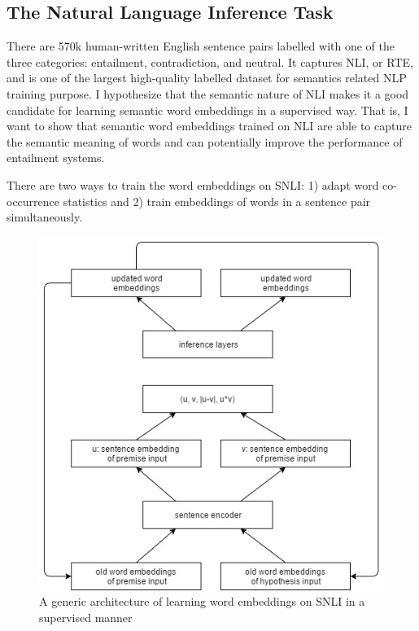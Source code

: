 \documentclass[10pt,twocolumn,letterpaper]{article}
\begin{document}
\subsection{The Natural Language Inference Task}
There are 570k human-written English sentence pairs labelled with one of the three categories: entailment, contradiction, and neutral. It captures NLI, or RTE, and is one of the largest high-quality labelled dataset for semantics related NLP training purpose. I hypothesize that the semantic nature of NLI makes it a good candidate for learning semantic word embeddings in a supervised way. That is, I want to show that semantic word embeddings trained on NLI are able to capture the semantic meaning of words and can potentially improve the performance of entailment systems.

There are two ways to train the word embeddings on SNLI: 1) adapt word co-occurrence statistics and 2) train embeddings of words in a sentence pair simultaneously.

\begin{figure}[ht]
\begin{center}
\includegraphics[scale=0.5]{model_architecture}
\end{center}
\caption{A generic architecture of learning word embeddings on SNLI in a supervised manner}
\label{fig:model_arc}
\end{figure}
\end{document}
